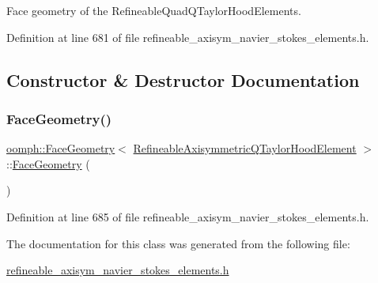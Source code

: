 Face geometry of the Refineable\+Quad\+Q\+Taylor\+Hood\+Elements. 

Definition at line 681 of file refineable\+\_\+axisym\+\_\+navier\+\_\+stokes\+\_\+elements.\+h.



\subsection{Constructor \& Destructor Documentation}
\mbox{\label{classoomph_1_1FaceGeometry_3_01RefineableAxisymmetricQTaylorHoodElement_01_4_a8d7c1424438b8b1b3d48878415f64d47}} 
\subsubsection{\texorpdfstring{Face\+Geometry()}{FaceGeometry()}}
{\footnotesize\ttfamily \hyperlink{classoomph_1_1FaceGeometry}{oomph\+::\+Face\+Geometry}$<$ \hyperlink{classoomph_1_1RefineableAxisymmetricQTaylorHoodElement}{Refineable\+Axisymmetric\+Q\+Taylor\+Hood\+Element} $>$\+::\hyperlink{classoomph_1_1FaceGeometry}{Face\+Geometry} (\begin{DoxyParamCaption}{ }\end{DoxyParamCaption})\hspace{0.3cm}{\ttfamily [inline]}}



Definition at line 685 of file refineable\+\_\+axisym\+\_\+navier\+\_\+stokes\+\_\+elements.\+h.



The documentation for this class was generated from the following file\+:\begin{DoxyCompactItemize}
\item 
\hyperlink{refineable__axisym__navier__stokes__elements_8h}{refineable\+\_\+axisym\+\_\+navier\+\_\+stokes\+\_\+elements.\+h}\end{DoxyCompactItemize}
